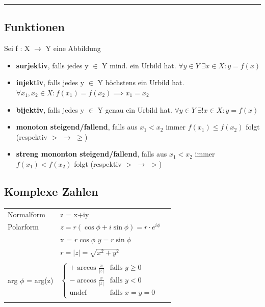 \documentclass[6pt]{article}
\begin{document}
\begin{multicols*}{3}
\vspace{-6mm}
\noindent\rule{9cm}{0.1pt}
\vspace{-5mm}

\subsection*{Funktionen}
Sei f : X $\rightarrow$ Y eine Abbildung
\begin{itemize}[leftmargin=*,align=left]
	\setlength{\itemsep}{2pt}
		\item {\bf surjektiv}, falls jedes y $\in$ Y mind. ein Urbild hat. \newline
				 $\forall y \in Y \; \exists x \in X: y = f(x)$
		\item  {\bf injektiv}, falls jedes y $\in$ Y h{\"o}chstens ein Urbild hat. \newline
				 $ \forall x_1,x_2 \in X: f(x_1) = f(x_2) \implies x_1 = x_2$
		\item  {\bf bijektiv}, falls jedes y $\in$ Y genau ein Urbild hat. \newline
				 $\forall y \in Y \; \exists ! x \in X: y = f(x)$
		\item {\bf monoton steigend/fallend}, falls aus $x_1 < x_2$ immer $f(x_1) \leq f(x_2)$ folgt (respektiv $>$ $\rightarrow$ $\geq$)
		\item {\bf streng mononton steigend/fallend},  falls aus $x_1 < x_2$ immer $f(x_1) < f(x_2)$ folgt (respektiv $>$ $\rightarrow$ $>$)
	\end{itemize}
	
\columnbreak


\subsection*{Komplexe Zahlen}

\begin{tabular}{lll}
 Normalform 		&  z = x+iy \\
 Polarform 			&	$z = r (\cos \phi +i \sin \phi) = r \cdot e^{i \phi}$ \\ 
									& x =  $r \cos \phi$ \quad $y = r \sin \phi$ \\
 									&  $r = |z| =\sqrt{x^2+y^2}$ \\
 									& \\
 arg $\phi$ = arg(z) & $\left\{ \begin{array}{ll} + \arccos \tfrac{x}{|z|} & \text{falls } y \geq 0 \\ - \arccos \tfrac{x}{|z|} & \text{falls } y < 0 \\ \text{undef} & \text{falls } x = y = 0 \end{array} \right.$ \\
 									&  \vspace{5mm}\\
 				

\end{tabular}
\end{multicols*}
\end{document}
